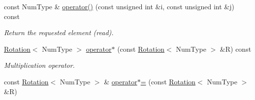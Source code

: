 \begin{DoxyCompactItemize}
const Num\+Type \& \hyperlink{singletonscrews_1_1_rotation_abc04a3b626fd693c26e9c3ec51c5ddf2}{operator()} (const unsigned int \&i, const unsigned int \&j) const 
\begin{DoxyCompactList}\small\item\em Return the requested element (read). \end{DoxyCompactList}\item 
\hypertarget{singletonscrews_1_1_rotation_a070845699aaa7d1624520c105dc8286c}{\hyperlink{singletonscrews_1_1_rotation}{Rotation}$<$ Num\+Type $>$ \hyperlink{singletonscrews_1_1_rotation_a070845699aaa7d1624520c105dc8286c}{operator$\ast$} (const \hyperlink{singletonscrews_1_1_rotation}{Rotation}$<$ Num\+Type $>$ \&R) const }\label{singletonscrews_1_1_rotation_a070845699aaa7d1624520c105dc8286c}

\begin{DoxyCompactList}\small\item\em Multiplication operator. \end{DoxyCompactList}\item 
\hypertarget{singletonscrews_1_1_rotation_aa280d6c2c8a5e5a8ddce5fd77a921513}{const \hyperlink{singletonscrews_1_1_rotation}{Rotation}$<$ Num\+Type $>$ \& \hyperlink{singletonscrews_1_1_rotation_aa280d6c2c8a5e5a8ddce5fd77a921513}{operator$\ast$=} (const \hyperlink{singletonscrews_1_1_rotation}{Rotation}$<$ Num\+Type $>$ \&R)}\label{singletonscrews_1_1_rotation_aa280d6c2c8a5e5a8ddce5fd77a921513}


\end{DoxyCompactItemize}
